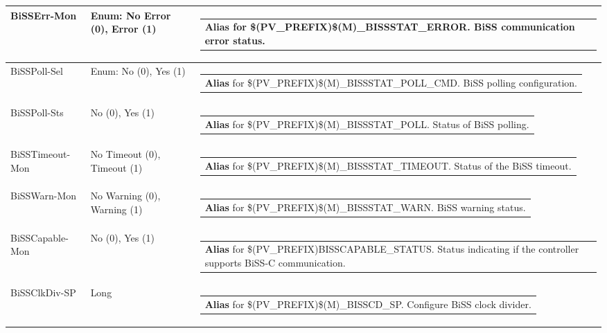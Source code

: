 \documentclass[openany]{article}
\begin{document}
\begin{longtable}{| m{4.5cm} m{2.5cm}  m{8.5cm} |}
        BiSSErr-Mon & Enum: No Error (0), Error (1) & \begin{tabular}{@{}m{6cm}@{}}
                \textbf{\color{blue} Alias} for \$(PV\_PREFIX)\$(M)\_BISSSTAT\_ERROR. BiSS communication error status.
            \end{tabular} \hypertarget{pv:biss-poll}{}\\ \hline
        BiSSPoll-Sel & Enum: No (0), Yes (1) & \begin{tabular}{@{}m{6cm}@{}}
                \textbf{\color{blue} Alias} for \$(PV\_PREFIX)\$(M)\_BISSSTAT\_POLL\_CMD. BiSS polling configuration.
            \end{tabular} \hypertarget{}{}\\ \hline
        BiSSPoll-Sts & No (0), Yes (1) & \begin{tabular}{@{}m{6cm}@{}}
                \textbf{\color{blue} Alias} for \$(PV\_PREFIX)\$(M)\_BISSSTAT\_POLL. Status of BiSS polling.
            \end{tabular} \hypertarget{pv:biss-timeout-mon}{}\\ \hline
        BiSSTimeout-Mon & No Timeout (0), Timeout (1) & \begin{tabular}{@{}m{6cm}@{}}
                \textbf{\color{blue} Alias} for \$(PV\_PREFIX)\$(M)\_BISSSTAT\_TIMEOUT. Status of the BiSS timeout.
            \end{tabular} \hypertarget{pv:biss-warn-mon}{}\\ \hline
        BiSSWarn-Mon & No Warning (0), Warning (1) & \begin{tabular}{@{}m{6cm}@{}}
                \textbf{\color{blue} Alias} for \$(PV\_PREFIX)\$(M)\_BISSSTAT\_WARN. BiSS warning status.
            \end{tabular} \hypertarget{pv:biss-capable-mon}{}\\ \hline
        BiSSCapable-Mon & No (0), Yes (1) & \begin{tabular}{@{}m{6cm}@{}}
                \textbf{\color{blue} Alias} for \$(PV\_PREFIX)BISSCAPABLE\_STATUS. Status indicating if the controller supports BiSS-C communication.
            \end{tabular} \hypertarget{pv:biss-clk-div}{}\\ \hline
        BiSSClkDiv-SP & Long & \begin{tabular}{@{}m{6cm}@{}}
                \textbf{\color{blue} Alias} for \$(PV\_PREFIX)\$(M)\_BISSCD\_SP. Configure BiSS clock divider.

\end{tabular}
\end{longtable}
\end{document}
